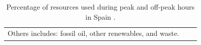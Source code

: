 {{ \begin{table}[]
\centering
\caption{Percentage of resources used during peak and off-peak hours in Spain \cite{Entso-eProduction}.}
\label{RES_ES}
\begin{tabular}{ccc}
\multicolumn{1}{c}{\footnotesize*Others includes: fossil oil, other renewables, and waste.}
\end{tabular}

\end{table}



}}
